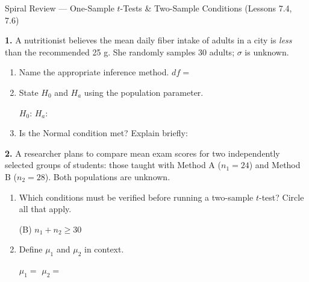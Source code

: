 \documentclass[10pt]{article}
\begin{document}
\namedateperiod

\vspace{0.10in}

\begin{notesbox}{Spiral Review --- One-Sample $t$-Tests \& Two-Sample Conditions (Lessons 7.4, 7.6)}

\textbf{1.} A nutritionist believes the mean daily fiber intake of adults in a city is
\emph{less} than the recommended 25 g. She randomly samples 30 adults; $\sigma$ is unknown.

\begin{enumerate}[label=\alph*.]
  \item Name the appropriate inference method.  \quad $df = $ 
  \item State $H_0$ and $H_a$ using the population parameter.

        $H_0$:  \qquad $H_a$: 
  \item Is the Normal condition met?  \; Explain briefly: 
\end{enumerate}

\vspace{0.08in}
\textbf{2.} A researcher plans to compare mean exam scores for two independently selected
groups of students: those taught with Method A ($n_1 = 24$) and Method B ($n_2 = 28$).
Both populations are unknown.

\begin{enumerate}[label=\alph*.]
  \item Which conditions must be verified before running a two-sample $t$-test? Circle all that apply.

        \quad {} \quad
        (B) $n_1 + n_2 \ge 30$ \quad
         \quad

  \item Define $\mu_1$ and $\mu_2$ in context.

        $\mu_1 = $  \qquad
        $\mu_2 = $ 
\end{enumerate}

\end{notesbox}
\end{document}
